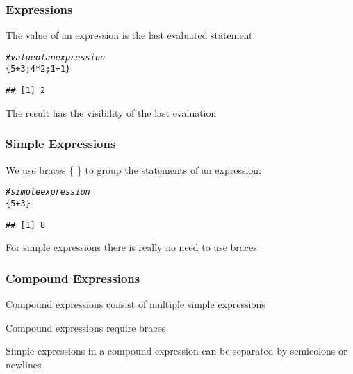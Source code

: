 \documentclass[12pt]{beamer}\usepackage[]{graphicx}\usepackage[]{color}
\makeatletter
\newcommand{\hlnum}[1]{\textcolor[rgb]{0.686,0.059,0.569}{#1}}%
\newcommand{\hlcom}[1]{\textcolor[rgb]{0.678,0.584,0.686}{\textit{#1}}}%
\newcommand{\hlopt}[1]{\textcolor[rgb]{0,0,0}{#1}}%
\newcommand{\hlstd}[1]{\textcolor[rgb]{0.345,0.345,0.345}{#1}}%
\newenvironment{kframe}{%
 \def\at@end@of@kframe{}%
 \ifinner\ifhmode%
  \def\at@end@of@kframe{\end{minipage}}%
  \begin{minipage}{\columnwidth}%
 \fi\fi%
 \def\FrameCommand##1{\hskip\@totalleftmargin \hskip-\fboxsep
 \colorbox{shadecolor}{##1}\hskip-\fboxsep
     \hskip-\linewidth \hskip-\@totalleftmargin \hskip\columnwidth}%
 \MakeFramed {\advance\hsize-\width
   \@totalleftmargin\z@ \linewidth\hsize
   \@setminipage}}%
 {\par\unskip\endMakeFramed%
 \at@end@of@kframe}
\newenvironment{knitrout}{}{} %
\makeatother
\begin{document}

\begin{frame}[fragile]
\frametitle{Expressions}

The value of an expression is the last evaluated statement:
\begin{knitrout}\footnotesize
{}\color{fgcolor}\begin{kframe}
\begin{alltt}
\hlcom{# value of an expression}
\hlstd{\{}\hlnum{5} \hlopt{+} \hlnum{3}\hlstd{;} \hlnum{4} \hlopt{*} \hlnum{2}\hlstd{;} \hlnum{1} \hlopt{+} \hlnum{1}\hlstd{\}}
\end{alltt}
\begin{verbatim}
## [1] 2
\end{verbatim}
\end{kframe}
\end{knitrout}
The result has the visibility of the last evaluation

\end{frame}


\begin{frame}[fragile]
\frametitle{Simple Expressions}

We use braces \{ \} to group the statements of an expression:
\begin{knitrout}\footnotesize
{}\color{fgcolor}\begin{kframe}
\begin{alltt}
\hlcom{# simple expression}
\hlstd{\{}\hlnum{5} \hlopt{+} \hlnum{3}\hlstd{\}}
\end{alltt}
\begin{verbatim}
## [1] 8
\end{verbatim}
\end{kframe}
\end{knitrout}
For simple expressions there is really no need to use braces

\end{frame}


\begin{frame}[fragile]
\frametitle{Compound Expressions}

\bbi
  \item Compound expressions consist of multiple simple expressions
  \item Compound expressions require braces
  \item Simple expressions in a compound expression can be separated by semicolons or newlines
\ei

\end{frame}
\end{document}
